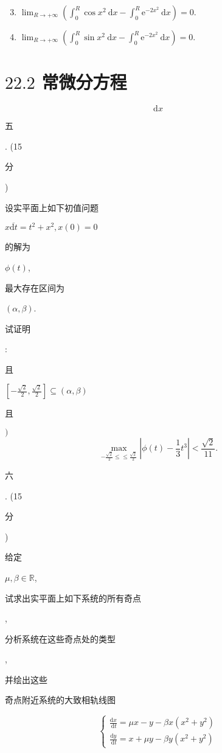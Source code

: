 \documentclass[10pt]{article}
\begin{document}
\begin{enumerate}
  \setcounter{enumi}{2}
  \item $\lim _{R \rightarrow+\infty}\left(\int_{0}^{R} \cos x^{2} \mathrm{~d} x-\int_{0}^{R} \mathrm{e}^{-2 x^{2}} \mathrm{~d} x\right)=0$.

  \item $\lim _{R \rightarrow+\infty}\left(\int_{0}^{R} \sin x^{2} \mathrm{~d} x-\int_{0}^{R} \mathrm{e}^{-2 x^{2}} \mathrm{~d} x\right)=0$.

\end{enumerate}
\section{$22.2$ 常微分方程}
$$
\mathrm{d} x
$$
\begin{CJK}{UTF8}{mj}五\end{CJK}. (15 \begin{CJK}{UTF8}{mj}分\end{CJK}) \begin{CJK}{UTF8}{mj}设实平面上如下初值问题\end{CJK} $x \overline{\mathrm{d} t}=t^{2}+x^{2}, x(0)=0$ \begin{CJK}{UTF8}{mj}的解为\end{CJK} $\phi(t)$, \begin{CJK}{UTF8}{mj}最大存在区间为\end{CJK} $(\alpha, \beta)$. \begin{CJK}{UTF8}{mj}试证明\end{CJK}: \begin{CJK}{UTF8}{mj}且\end{CJK} $\left[-\frac{\sqrt{2}}{2}, \frac{\sqrt{2}}{2}\right] \subseteq(\alpha, \beta)$ \begin{CJK}{UTF8}{mj}且\end{CJK} $)$
$$
\max _{-\frac{\sqrt{2}}{2} \leqslant \leqslant \frac{\sqrt{2}}{2}}\left|\phi(t)-\frac{1}{3} t^{3}\right|<\frac{\sqrt{2}}{11} .
$$
\begin{CJK}{UTF8}{mj}六\end{CJK}. (15 \begin{CJK}{UTF8}{mj}分\end{CJK}) \begin{CJK}{UTF8}{mj}给定\end{CJK} $\mu, \beta \in \mathbb{R}$, \begin{CJK}{UTF8}{mj}试求出实平面上如下系统的所有奇点\end{CJK}, \begin{CJK}{UTF8}{mj}分析系统在这些奇点处的类型\end{CJK}, \begin{CJK}{UTF8}{mj}并绘出这些\end{CJK} \begin{CJK}{UTF8}{mj}奇点附近系统的大致相轨线图\end{CJK}
$$
\left\{\begin{array}{l}
\frac{\mathrm{d} x}{\mathrm{~d} t}=\mu x-y-\beta x\left(x^{2}+y^{2}\right) \\
\frac{\mathrm{d} y}{\mathrm{~d} t}=x+\mu y-\beta y\left(x^{2}+y^{2}\right)
\end{array}\right.
$$
\end{document}
